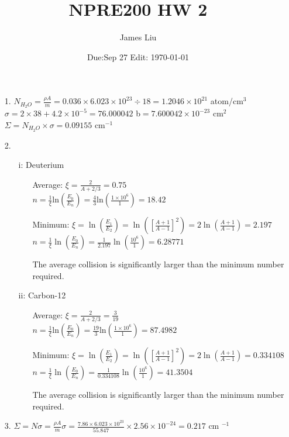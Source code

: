 \documentclass{article}
\date{Due:Sep 27 Edit: \today}
\title{NPRE200 HW 2}
\author{James Liu}
\begin{document}
\maketitle
\begin{itemize}
    \item [1.] \(N_{H_2O} = \frac{\rho A}{m} = 0.036\times 6.023\times 10^{23} \div 18 = 1.2046\times 10^{21}\) atom/cm\(^3\)
                \\ \(\sigma = 2\times 38 + 4.2\times 10^{-5} = 76.000042\) b\( = 7.600042 \times 10^{-23}\) cm\(^2\)\\
                \(\Sigma = N_{H_2O}\times \sigma = 0.09155\) cm\(^{-1}\)
                
    \item [2.]
    \begin{itemize}
        \item [i:] Deuterium
        \begin{itemize}
            \item [Average:] \(\xi = \frac{2}{A+2/3} = 0.75 \)\\
                                \(n = \frac{1}{\xi}\text{ln}\left(\frac{E_0}{E_n}\right) = \frac{4}{3}\text{ln}\left(\frac{1\times10^6}{1}\right) = 18.42\)
            \item [Minimum:] \(\xi = \ln\left(\frac{E_1}{E_2}\right)= \ln\left(\left[\frac{A+1}{A-1}\right]^2\right)=2\ln\left(\frac{A+1}{A-1}\right) = 2.197\)\\
                                \(n = \frac{1}{\xi}\ln\left(\frac{E_0}{E_n}\right) = \frac{1}{2.197}\ln\left(\frac{10^6}{1}\right)=6.28771\)
            \item [] The average collision is significantly larger than the minimum number required.

        \end{itemize}
        
        \item [ii:] Carbon-12
        \begin{itemize}
            \item [Average:] \(\xi = \frac{2}{A+2/3} = \frac{3}{19} \)\\
                                \(n = \frac{1}{\xi}\text{ln}\left(\frac{E_0}{E_n}\right) = \frac{19}{3}\text{ln}\left(\frac{1\times10^6}{1}\right) = 87.4982\)
            \item [Minimum:] \(\xi = \ln\left(\frac{E_1}{E_2}\right)= \ln\left(\left[\frac{A+1}{A-1}\right]^2\right)=2\ln\left(\frac{A+1}{A-1}\right) = 0.334108\)\\
                                \(n = \frac{1}{\xi}\ln\left(\frac{E_0}{E_n}\right) = \frac{1}{0.334108}\ln\left(\frac{10^6}{1}\right)=41.3504\)
            \item [] The average collision is significantly larger than the minimum number required.
        \end{itemize}
    \end{itemize}
    \item [3.] \(\Sigma = N\sigma = \frac{\rho A}{m} \sigma = \frac{7.86\times6.023\times 10^{23}}{55.847}\times 2.56\times 10^{-24} = 0.217\) cm \(^{-1}\)
    

\end{itemize}
\end{document}
